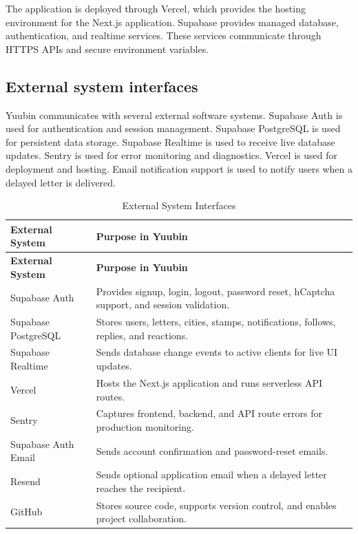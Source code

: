﻿\documentclass[12pt,a4paper]{report}
\begin{document}
The application is deployed through Vercel, which provides the hosting environment for the Next.js application. Supabase provides managed database, authentication, and realtime services. These services communicate through HTTPS APIs and secure environment variables.

\subsection{External system interfaces}

Yuubin communicates with several external software systems. Supabase Auth is used for authentication and session management. Supabase PostgreSQL is used for persistent data storage. Supabase Realtime is used to receive live database updates. Sentry is used for error monitoring and diagnostics. Vercel is used for deployment and hosting. Email notification support is used to notify users when a delayed letter is delivered.

\begin{longtable}{p{4cm} p{10cm}}
\caption{External System Interfaces}
\label{tab:external_interfaces}\\
\toprule
\textbf{External System} & \textbf{Purpose in Yuubin} \\
\midrule
\endfirsthead
\toprule
\textbf{External System} & \textbf{Purpose in Yuubin} \\
\midrule
\endhead
Supabase Auth & Provides signup, login, logout, password reset, hCaptcha support, and session validation. \\
Supabase PostgreSQL & Stores users, letters, cities, stamps, notifications, follows, replies, and reactions. \\
Supabase Realtime & Sends database change events to active clients for live UI updates. \\
Vercel & Hosts the Next.js application and runs serverless API routes. \\
Sentry & Captures frontend, backend, and API route errors for production monitoring. \\
Supabase Auth Email & Sends account confirmation and password-reset emails. \\
Resend & Sends optional application email when a delayed letter reaches the recipient. \\
GitHub & Stores source code, supports version control, and enables project collaboration. \\
\bottomrule
\end{longtable}
\end{document}
